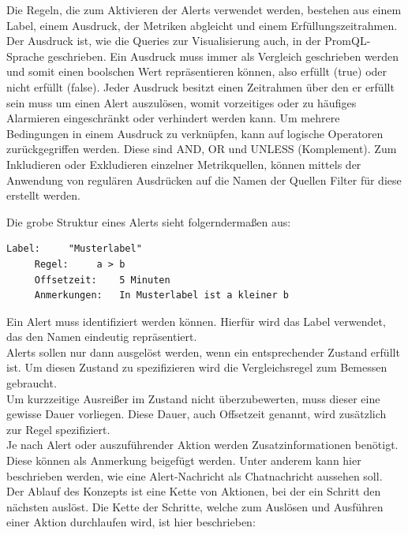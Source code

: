 \documentclass[a4paper,10pt]{scrartcl}
\begin{document}
Die Regeln, die zum Aktivieren der Alerts verwendet werden, bestehen aus einem Label, einem Ausdruck, der Metriken abgleicht und einem Erfüllungszeitrahmen.
Der Ausdruck ist, wie die Queries zur Visualisierung auch, in der PromQL-Sprache geschrieben. Ein Ausdruck muss immer als Vergleich geschrieben werden und somit einen boolschen Wert repräsentieren können, also erfüllt (true) oder nicht erfüllt (false).
Jeder Ausdruck besitzt einen Zeitrahmen über den er erfüllt sein muss um einen Alert auszulösen, womit vorzeitiges oder zu häufiges Alarmieren eingeschränkt oder verhindert werden kann.
Um mehrere Bedingungen in einem Ausdruck zu verknüpfen, kann auf logische Operatoren zurückgegriffen werden. Diese sind AND, OR und UNLESS (Komplement).
Zum Inkludieren oder Exkludieren einzelner Metrikquellen, können mittels der Anwendung von regulären Ausdrücken auf die Namen der Quellen Filter für diese erstellt werden.

Die grobe Struktur eines Alerts sieht folgerndermaßen aus:\\

\begin{lstlisting}[basicstyle=\footnotesize]
     Label:		"Musterlabel"
     Regel:		a > b
     Offsetzeit:	5 Minuten
     Anmerkungen:	In Musterlabel ist a kleiner b
\end{lstlisting}

Ein Alert muss identifiziert werden können. Hierfür wird das Label verwendet, das den Namen eindeutig repräsentiert.\\
Alerts sollen nur dann ausgelöst werden, wenn ein entsprechender Zustand erfüllt ist. Um diesen Zustand zu spezifizieren wird die Vergleichsregel zum Bemessen gebraucht.\\
Um kurzzeitige Ausreißer im Zustand nicht überzubewerten, muss dieser eine gewisse Dauer vorliegen. Diese Dauer, auch Offsetzeit genannt, wird zusätzlich zur Regel spezifiziert.\\
Je nach Alert oder auszuführender Aktion werden Zusatzinformationen benötigt. Diese können als Anmerkung beigefügt werden. Unter anderem kann hier beschrieben werden, wie eine Alert-Nachricht als Chatnachricht aussehen soll.\\

Der Ablauf des Konzepts ist eine Kette von Aktionen, bei der ein Schritt den nächsten auslöst. Die Kette der Schritte, welche zum Auslösen und Ausführen einer Aktion durchlaufen wird, ist hier beschrieben:\\

\pagebreak
\end{document}
